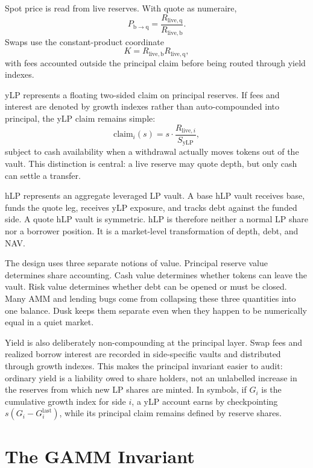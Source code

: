\documentclass[11pt]{article}
\newcommand{\base}{\mathrm{b}}
\newcommand{\qasset}{\mathrm{q}}
\newcommand{\live}{\mathrm{live}}
\newcommand{\ylp}{\mathrm{yLP}}
\begin{document}
Spot price is read from live reserves. With quote as numeraire,
\begin{equation}
P_{\base\to\qasset}=\frac{R_{\live,\qasset}}{R_{\live,\base}}.
\end{equation}
Swaps use the constant-product coordinate
\begin{equation}
K=R_{\live,\base}R_{\live,\qasset},
\end{equation}
with fees accounted outside the principal claim before being routed through yield indexes.

yLP represents a floating two-sided claim on principal reserves. If fees and interest are denoted by growth indexes rather than auto-compounded into principal, the yLP claim remains simple:
\begin{equation}
\mathrm{claim}_{i}(s)=s\cdot\frac{R_{\live,i}}{S_{\ylp}},
\end{equation}
subject to cash availability when a withdrawal actually moves tokens out of the vault. This distinction is central: a live reserve may quote depth, but only cash can settle a transfer.

hLP represents an aggregate leveraged LP vault. A base hLP vault receives base, funds the quote leg, receives yLP exposure, and tracks debt against the funded side. A quote hLP vault is symmetric. hLP is therefore neither a normal LP share nor a borrower position. It is a market-level transformation of depth, debt, and NAV.

The design uses three separate notions of value. Principal reserve value determines share accounting. Cash value determines whether tokens can leave the vault. Risk value determines whether debt can be opened or must be closed. Many AMM and lending bugs come from collapsing these three quantities into one balance. Dusk keeps them separate even when they happen to be numerically equal in a quiet market.

Yield is also deliberately non-compounding at the principal layer. Swap fees and realized borrow interest are recorded in side-specific vaults and distributed through growth indexes. This makes the principal invariant easier to audit: ordinary yield is a liability owed to share holders, not an unlabelled increase in the reserves from which new LP shares are minted. In symbols, if $G_i$ is the cumulative growth index for side $i$, a yLP account earns by checkpointing $s(G_i-G_i^{\mathrm{last}})$, while its principal claim remains defined by reserve shares.

\section{The GAMM Invariant}
\end{document}
